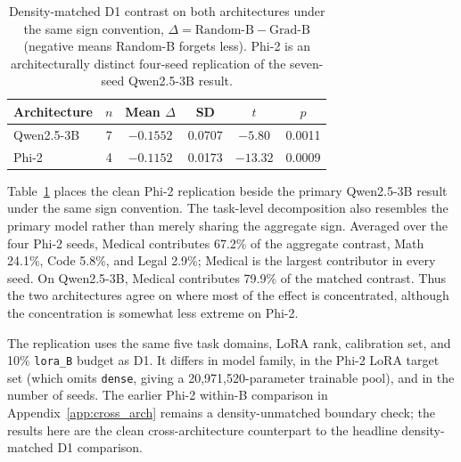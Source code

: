 \begin{table}[t]
\caption{Density-matched D1 contrast on both architectures under the same sign convention, $\Delta=\text{Random-B}-\text{Grad-B}$ (negative means Random-B forgets less). Phi-2 is an architecturally distinct four-seed replication of the seven-seed Qwen2.5-3B result.}
\label{tab:phi2_d1_compare}
\centering
\small
\begin{tabular}{@{}lccccc@{}}
\toprule
\textbf{Architecture} & \textbf{$n$} & \textbf{Mean $\Delta$} & \textbf{SD} & \textbf{$t$} & \textbf{$p$} \\
\midrule
Qwen2.5-3B & 7 & $-0.1552$ & 0.0707 & $-5.80$ & 0.0011 \\
Phi-2      & 4 & $-0.1152$ & 0.0173 & $-13.32$ & 0.0009 \\
\bottomrule
\end{tabular}
\end{table}

Table~\ref{tab:phi2_d1_compare} places the clean Phi-2 replication beside the primary Qwen2.5-3B result under the same sign convention. The task-level decomposition also resembles the primary model rather than merely sharing the aggregate sign. Averaged over the four Phi-2 seeds, Medical contributes 67.2\% of the aggregate contrast, Math 24.1\%, Code 5.8\%, and Legal 2.9\%; Medical is the largest contributor in every seed. On Qwen2.5-3B, Medical contributes 79.9\% of the matched contrast. Thus the two architectures agree on where most of the effect is concentrated, although the concentration is somewhat less extreme on Phi-2.

The replication uses the same five task domains, LoRA rank, calibration set, and 10\% \texttt{lora\_B} budget as D1. It differs in model family, in the Phi-2 LoRA target set (which omits \texttt{dense}, giving a 20{,}971{,}520-parameter trainable pool), and in the number of seeds. The earlier Phi-2 within-B comparison in Appendix~\ref{app:cross_arch} remains a density-unmatched boundary check; the results here are the clean cross-architecture counterpart to the headline density-matched D1 comparison.
